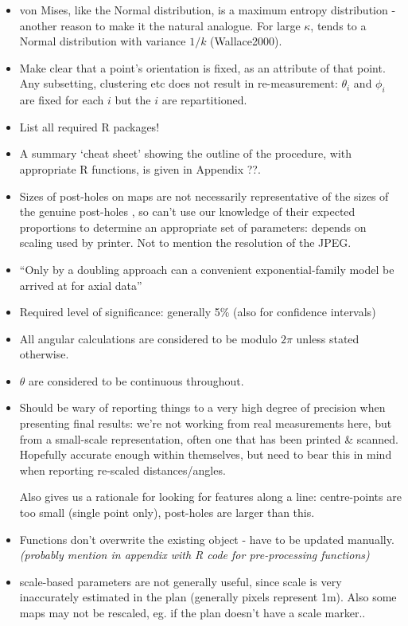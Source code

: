 \documentclass[12pt,fleqn]{article}
\numberwithin{equation}{section}
\begin{document}
\begin{itemize}
\item
von Mises, like the Normal distribution, is a maximum entropy distribution - another reason to make it the natural analogue. For large $\kappa$, tends to a Normal distribution with variance $1/k$ (Wallace2000).

\item
Make clear that a point's orientation is fixed, as an attribute of that point. Any subsetting, clustering etc does not result in re-measurement: $\theta_i$ and $\phi_i$ are fixed for each $i$ but the $i$ are repartitioned.

\item
List all required R packages!

\item
A summary `cheat sheet' showing the outline of the procedure, with appropriate R functions, is given in Appendix ??.

\item
Sizes of post-holes on maps are not necessarily representative of the sizes of the genuine post-holes , so can't use our knowledge of their expected proportions to determine an appropriate set of parameters: depends on scaling used by printer. Not to mention the resolution of the JPEG.

\item 
``Only by a doubling approach can a convenient exponential-family model be arrived at for axial data'' \cite{Arnold2011}

\item
Required level of significance: generally 5\% (also for confidence intervals)

\item
All angular calculations are considered to be modulo $2\pi$ unless stated otherwise.

\item
$\theta$ are considered to be continuous throughout.

\item
Should be wary of reporting things to a very high degree of precision when presenting final results: we're not working from real measurements here, but from a small-scale representation, often one that has been printed \& scanned. Hopefully accurate enough within themselves, but need to bear this in mind when reporting re-scaled distances/angles.

Also gives us a rationale for looking for features along a line: centre-points are too small (single point only), post-holes are larger than this.

\item
Functions don't overwrite the existing object - have to be updated manually.
\textit{(probably mention in appendix with R code for pre-processing functions)
}

\item
scale-based parameters are not generally useful, since scale is very inaccurately estimated in the plan (generally  pixels represent 1m). Also some maps may not be rescaled, eg. if the plan doesn't have a scale marker..

\end{itemize}
\newpage
\end{document}
